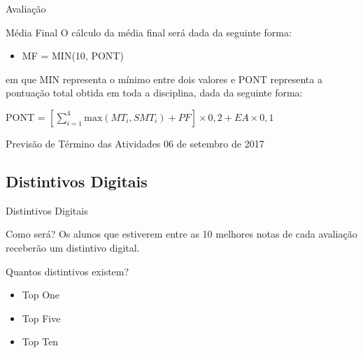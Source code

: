 \documentclass[xcolor=dvipsnames,table]{beamer}
\begin{document}
	\begin{frame}{Avaliação}
		\begin{block}{Média Final}
			O cálculo da média final será dada da seguinte forma:
			\begin{itemize}
				\item MF = MIN(10, PONT)
			\end{itemize}
			em que MIN representa o mínimo entre dois valores e PONT representa a pontuação total obtida em toda a disciplina, dada da seguinte forma:
			\begin{center}
				PONT = $\left[ \sum\limits_{i=1}^{4} \mbox{max}(MT_i, SMT_i) + PF \right] \times 0,2 + EA \times 0,1$
			\end{center}
		\end{block} \pause
		\begin{exampleblock}{Previsão de Término das Atividades}
			06 de setembro de 2017
		\end{exampleblock}
	\end{frame}
	
	\subsection{Distintivos Digitais}
	\begin{frame}{Distintivos Digitais}
		\begin{block}{Como será?}
			Os alunos que estiverem entre as 10 melhores notas de cada avaliação receberão um distintivo digital.
		\end{block} \pause
		\begin{block}{Quantos distintivos existem?}
			\begin{itemize}
				\item {\sc Top One}
				\item {\sc Top Five}
				\item {\sc Top Ten}
			\end{itemize}
		\end{block}
	\end{frame}
	
\end{document}
